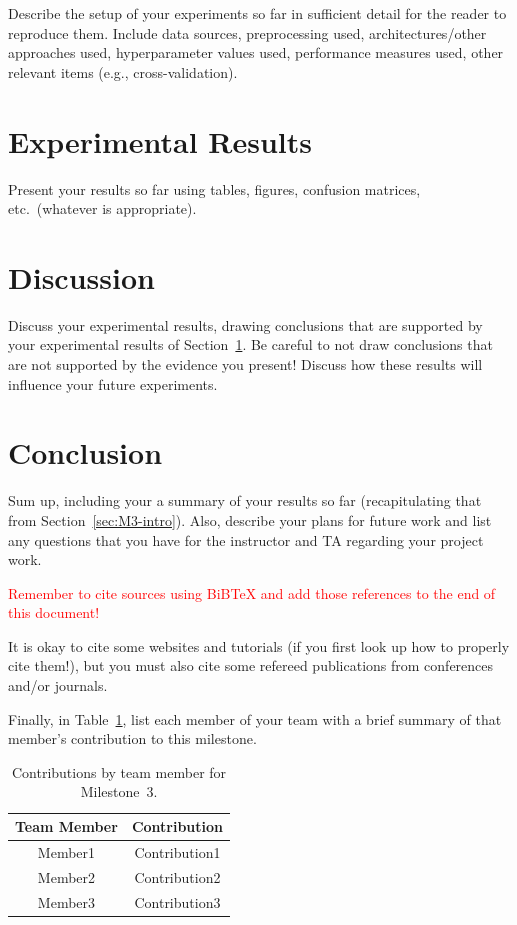 \documentclass{report}
\begin{document}
Describe the setup of your experiments so far in sufficient detail for the reader to reproduce them.  Include data sources, preprocessing used, architectures/other approaches used, hyperparameter values used, performance measures used, other relevant items (e.g., cross-validation).

\section{Experimental Results}
\label{sec:M3-results}

Present your results so far using tables, figures, confusion matrices, etc.\ (whatever is appropriate). 

\section{Discussion}

Discuss your experimental results, drawing conclusions that are supported by your experimental results of Section~\ref{sec:M3-results}.  Be careful to not draw conclusions that are not supported by the evidence you present! Discuss how these results will influence your future experiments.

\section{Conclusion}

Sum up, including your a summary of your results so far (recapitulating that from Section~\ref{sec:M3-intro}).  Also, describe your plans for future work and list any questions that you have for the instructor and TA regarding your project work.

\textcolor{red}{Remember to cite sources using BiBTeX and add those references to the end of this document!}

It is okay to cite some websites and tutorials (if you first look up how to properly cite them!), but you must also cite some refereed publications from conferences and/or journals.

Finally, in Table~\ref{tab:contribution3}, list each member of your team with a brief summary of that member's contribution to this milestone.

\begin{table}[]
    \caption{Contributions by team member for Milestone~3.}
    \centering
    \begin{tabular}{|c|c|} \hline
    {\bf Team Member}     &  {\bf Contribution}  \\ \hline
    Member1     &  Contribution1 \\
    Member2     &  Contribution2 \\
    Member3     &  Contribution3 \\ \hline
    \end{tabular}
    \label{tab:contribution3}
\end{table}
\end{document}
